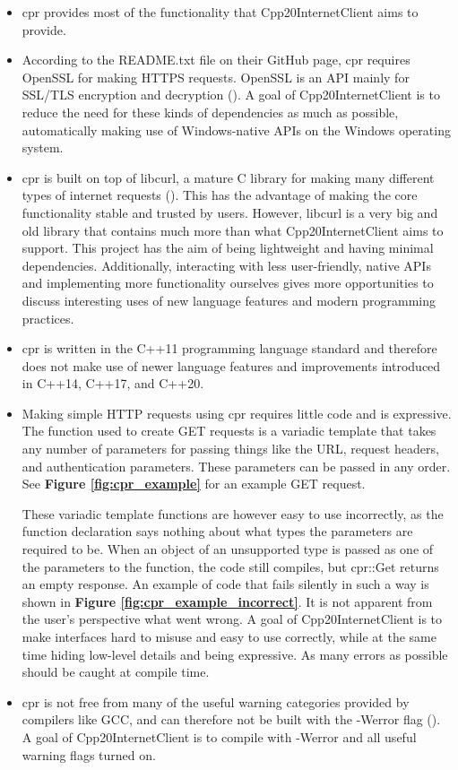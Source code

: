 \documentclass[12pt, a4paper]{article}
\begin{document}
\begin{itemize}
	\item cpr provides most of the functionality that Cpp20InternetClient aims to provide.
	\item According to the README.txt file on their GitHub page, cpr requires OpenSSL for making HTTPS requests. OpenSSL is an API mainly for SSL/TLS encryption and decryption (\cite{OpenSSL}). A goal of Cpp20InternetClient is to reduce the need for these kinds of dependencies as much as possible, automatically making use of Windows-native APIs on the Windows operating system. 
	\item cpr is built on top of libcurl, a mature C library for making many different types of internet requests (\cite{Libcurl}). This has the advantage of making the core functionality stable and trusted by users. However, libcurl is a very big and old library that contains much more than what Cpp20InternetClient aims to support. This project has the aim of being lightweight and having minimal dependencies. Additionally, interacting with less user-friendly, native APIs and implementing more functionality ourselves gives more opportunities to discuss interesting uses of new language features and modern programming practices.
	\item cpr is written in the C++11 programming language standard and therefore does not make use of newer language features and improvements introduced in C++14, C++17, and C++20.
	\item Making simple HTTP requests using cpr requires little code and is expressive. The function used to create GET requests is a variadic template that takes any number of parameters for passing things like the URL, request headers, and authentication parameters. These parameters can be passed in any order. See \textbf{Figure \ref{fig:cpr_example}} for an example GET request.

	These variadic template functions are however easy to use incorrectly, as the function declaration says nothing about what types the parameters are required to be. When an object of an unsupported type is passed as one of the parameters to the function, the code still compiles, but cpr::Get returns an empty response. An example of code that fails silently in such a way is shown in \textbf{Figure \ref{fig:cpr_example_incorrect}}. It is not apparent from the user’s perspective what went wrong. A goal of Cpp20InternetClient is to make interfaces hard to misuse and easy to use correctly, while at the same time hiding low-level details and being expressive. As many errors as possible should be caught at compile time.
	\item cpr is not free from many of the useful warning categories provided by compilers like GCC, and can therefore not be built with the -Werror flag (\cite{GccWarnings}). A goal of Cpp20InternetClient is to compile with -Werror and all useful warning flags turned on.
\end{itemize}
\end{document}
